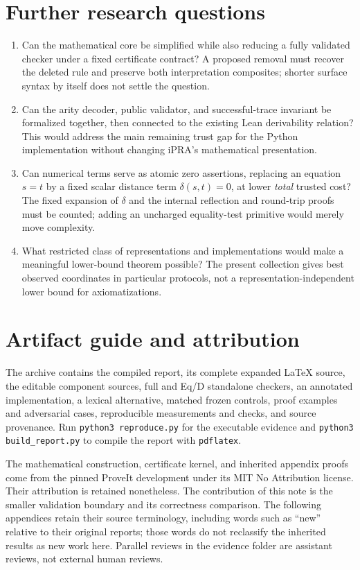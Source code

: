 \documentclass[11pt,letterpaper]{article}
\theoremstyle{definition}
\theoremstyle{remark}
\begin{document}
\Needspace{240pt}
\section{Further research questions}
\label{sec:further}
\begin{enumerate}
\item Can the mathematical core be simplified while also reducing a fully
validated checker under a fixed certificate contract? A proposed removal
must recover the deleted rule and preserve both interpretation composites;
shorter surface syntax by itself does not settle the question.
\item Can the arity decoder, public validator, and successful-trace invariant
be formalized together, then connected to the existing Lean derivability
relation? This would address the main remaining trust gap for the Python
implementation without changing iPRA's mathematical presentation.
\item Can numerical terms serve as atomic zero assertions, replacing an
equation $s=t$ by a fixed scalar distance term $\delta(s,t)=0$, at lower
\emph{total} trusted cost? The fixed expansion of $\delta$ and the internal
reflection and round-trip proofs must be counted; adding an uncharged
equality-test primitive would merely move complexity.
\item What restricted class of representations and implementations would
make a meaningful lower-bound theorem possible? The present collection
gives best observed coordinates in particular protocols, not a
representation-independent lower bound for axiomatizations.
\end{enumerate}

\section*{Artifact guide and attribution}
The archive contains the compiled report, its complete expanded LaTeX source,
the editable component sources, full and Eq/D standalone checkers, an annotated
implementation, a lexical alternative, matched frozen controls,
proof examples and adversarial cases, reproducible measurements and checks,
and source provenance. Run \texttt{python3 reproduce.py} for the executable
evidence and \texttt{python3 build\_report.py} to compile the report with
\texttt{pdflatex}.

The mathematical construction, certificate kernel, and inherited appendix
proofs come from the pinned ProveIt development under its MIT No Attribution
license. Their attribution is retained nonetheless. The contribution of
this note is the smaller validation boundary and its correctness comparison.
The following appendices retain their source terminology, including words
such as ``new'' relative to their original reports; those words do not
reclassify the inherited results as new work here. Parallel reviews in the
evidence folder are assistant reviews, not external human reviews.
\end{document}
